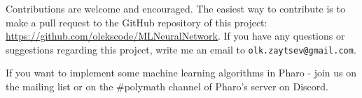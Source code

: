 Contributions are welcome and encouraged. The easiest way to contribute is to make a pull request to the GitHub repository of this project: \url{https://github.com/olekscode/MLNeuralNetwork}. If you have any questions or suggestions regarding this project, write me an email to \texttt{olk.zaytsev@gmail.com}.

If you want to implement some machine learning algorithms in Pharo - join us on the mailing list or on the \#polymath channel of Pharo's server on Discord.

